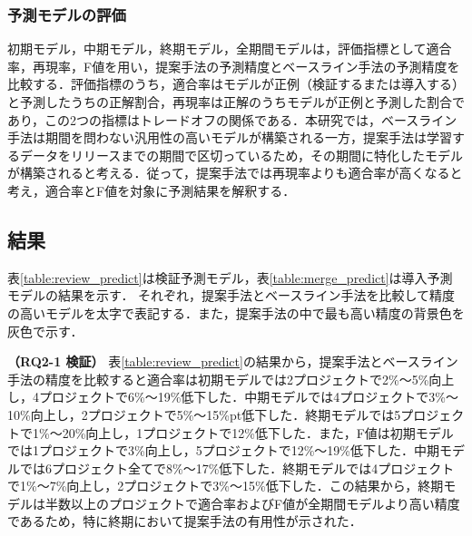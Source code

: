 \documentclass[T,J]{fose} %
\newcommand{\todo}[1]{\colorbox{yellow}{{\bf TODO}:}{\color{red} {\textbf{[#1]}}}}
\newcommand{\change}[1]{\colorbox{green}{{\bf CHANGE}:}{\color{black} {\textbf{[#1]}}}}
\begin{document}
\subsubsection{予測モデルの評価}
初期モデル，中期モデル，終期モデル，全期間モデルは，評価指標として適合率，再現率，F値を用い，提案手法の予測精度とベースライン手法の予測精度を比較する．評価指標のうち，適合率はモデルが正例（検証するまたは導入する）と予測したうちの正解割合，再現率は正解のうちモデルが正例と予測した割合であり，この2つの指標はトレードオフの関係である．本研究では，ベースライン手法は期間を問わない汎用性の高いモデルが構築される一方，提案手法は学習するデータをリリースまでの期間で区切っているため，その期間に特化したモデルが構築されると考える．従って，提案手法では再現率よりも適合率が高くなると考え，適合率とF値を対象に予測結果を解釈する．

\subsection{結果}
表\ref{table:review_predict}は検証予測モデル，表\ref{table:merge_predict}は導入予測モデルの結果を示す．
それぞれ，提案手法とベースライン手法を比較して精度の高いモデルを太字で表記する．また，提案手法の中で最も高い精度の背景色を灰色で示す．

\textbf{（RQ2-1 検証）} 表\ref{table:review_predict}の結果から，提案手法とベースライン手法の精度を比較すると適合率は初期モデルでは2プロジェクトで2\%〜5\%向上し，4プロジェクトで6\%〜19\%低下した．中期モデルでは4プロジェクトで3\%〜10\%向上し，2プロジェクトで5\%〜15\%pt低下した．終期モデルでは5プロジェクトで1\%〜20\%向上し，1プロジェクトで12\%低下した．また，F値は初期モデルでは1プロジェクトで3\%向上し，5プロジェクトで12\%〜19\%低下した．中期モデルでは6プロジェクト全てで8\%〜17\%低下した．終期モデルでは4プロジェクトで1\%〜7\%向上し，2プロジェクトで3\%〜15\%低下した．この結果から，終期モデルは半数以上のプロジェクトで適合率およびF値が全期間モデルより高い精度であるため，特に終期において提案手法の有用性が示された．
\end{document}
